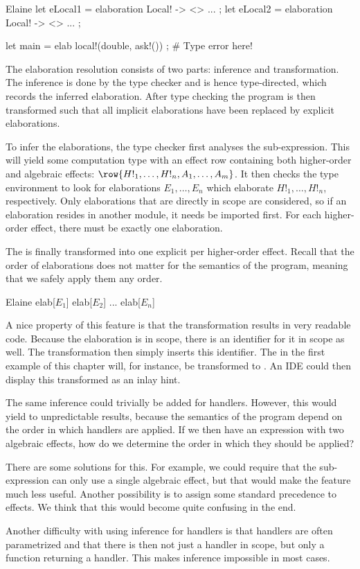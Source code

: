 \begin{lst}{Elaine}
let eLocal1 = elaboration Local! -> <> { ... };
let eLocal2 = elaboration Local! -> <> { ... };

let main = elab { local!(double, ask!()) }; # Type error here!
\end{lst}

The elaboration resolution consists of two parts: inference and transformation. The inference is done by the type checker and is hence type-directed, which records the inferred elaboration. After type checking the program is then transformed such that all implicit elaborations have been replaced by explicit elaborations.

To infer the elaborations, the type checker first analyses the sub-expression. This will yield some computation type with an effect row containing both higher-order and algebraic effects: $\row{H!_1, \dots, H!_n, A_1, \dots, A_m}$. It then checks the type environment to look for elaborations $E_1, \dots, E_n$ which elaborate $H!_1, \dots, H!_n$, respectively. Only elaborations that are directly in scope are considered, so if an elaboration resides in another module, it needs be imported first. For each higher-order effect, there must be exactly one elaboration.

The  is finally transformed into one explicit  per higher-order effect. Recall that the order of elaborations does not matter for the semantics of the program, meaning that we safely apply them any order.

\begin{lst}{Elaine}
elab[$E_1$] elab[$E_2$] ... elab[$E_n$]
\end{lst}

A nice property of this feature is that the transformation results in very readable code. Because the elaboration is in scope, there is an identifier for it in scope as well. The transformation then simply inserts this identifier. The \elab in the first example of this chapter will, for instance, be transformed to . An IDE could then display this transformed  as an inlay hint.


The same inference could trivially be added for handlers. However, this would yield to unpredictable results, because the semantics of the program depend on the order in which handlers are applied. If we then have an expression with two algebraic effects, how do we determine the order in which they should be applied?

There are some solutions for this. For example, we could require that the sub-expression can only use a single algebraic effect, but that would make the feature much less useful. Another possibility is to assign some standard precedence to effects. We think that this would become quite confusing in the end.

Another difficulty with using inference for handlers is that handlers are often parametrized and that there is then not just a handler in scope, but only a function returning a handler. This makes inference impossible in most cases.

